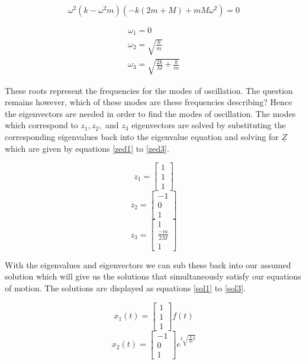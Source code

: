 \documentclass[hidelinks]{article}
\begin{document}
\begin{multicols}{2}
\begin{equation}
\label{quad}
\omega^2(k-\omega^2m)(-k(2m+M)+mM\omega^2)=0
\end{equation}

\begin{equation}
\label{roots}
\begin{split}
\omega_1=0\\
\omega_2=\sqrt{\frac{k}{m}}\\
\omega_3=\sqrt{\frac{2k}{M}+\frac{k}{m}}
\end{split}
\end{equation}

These roots represent the frequencies for the modes of oscillation. The question remains however, which of these modes are these frequencies describing? Hence the eigenvectors are needed in order to find the modes of oscillation. The modes which correspond to $z_1, z_2,$ and $z_3$ eigenvectors are solved by substituting the corresponding eigenvalues back into the eigenvalue equation and solving for $\underline{Z}$ which are given by equations \ref{zed1} to \ref{zed3}.

\begin{equation}
\label{zed1}
z_1=
\begin{bmatrix}
1\\
1\\
1
\end{bmatrix}
\end{equation}
\begin{equation}
\label{zed2}
z_2=
\begin{bmatrix}
-1\\
0\\
1
\end{bmatrix}
\end{equation}
\begin{equation}
\label{zed3}
z_3=
\begin{bmatrix}
1\\
\frac{-m}{2M}\\
1
\end{bmatrix}
\end{equation}

With the eigenvalues and eigenvectors we can sub these back into our assumed solution which will give us the solutions that simultaneously satisfy our equations of motion. The solutions are displayed as equations \ref{sol1} to \ref{sol3}.

\begin{equation}
\label{sol1}
x_1(t)=
\begin{bmatrix}
1\\
1\\
1
\end{bmatrix}
f(t)
\end{equation}
\begin{equation}
\label{sol2}
x_2(t)=
\begin{bmatrix}
-1\\
0\\
1
\end{bmatrix}
e^{i\sqrt{\frac{k}{m}t}}
\end{equation}


\end{multicols}
\end{document}

